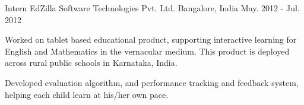 \begin{cventries}
	\cventry
	{Intern}
	{EdZilla Software Technologies Pvt. Ltd.}
	{Bangalore, India}
	{May. 2012 - Jul. 2012}
	{
		\begin{cvitems}
		\item{Worked on tablet based educational product, supporting interactive learning for English and Mathematics in the vernacular medium. This product is deployed across rural public schools in Karnataka, India.}
		\item{Developed evaluation algorithm, and performance tracking and feedback system, helping each child learn at his/her own pace.}
		\end{cvitems}
	}

\end{cventries}
